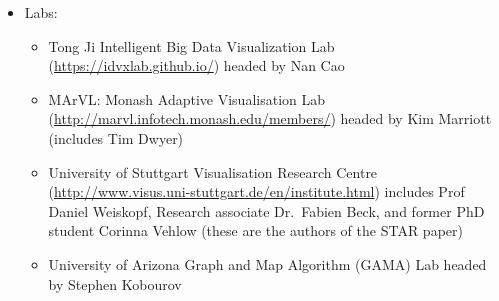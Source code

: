 \begin{itemize}
\tightlist
\item
  Labs:

  \begin{itemize}
  \tightlist
  \item
    Tong Ji Intelligent Big Data Visualization Lab
    (\url{https://idvxlab.github.io/}) headed by Nan Cao
  \item
    MArVL: Monash Adaptive Visualisation Lab
    (\url{http://marvl.infotech.monash.edu/members/}) headed by Kim
    Marriott (includes Tim Dwyer)
  \item
    University of Stuttgart Visualisation Research Centre
    (\url{http://www.visus.uni-stuttgart.de/en/institute.html}) includes
    Prof Daniel Weiskopf, Research associate Dr.~Fabien Beck, and former
    PhD student Corinna Vehlow (these are the authors of the STAR paper)
  \item
    University of Arizona Graph and Map Algorithm (GAMA) Lab headed by
    Stephen Kobourov
  \end{itemize}
\end{itemize}

